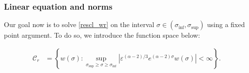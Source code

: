 \documentclass[letterpaper,11pt]{article}
\newcommand{\eps}{\varepsilon}
\numberwithin{equation}{section}
\theoremstyle{plain}
\begin{document}
\subsubsection{Linear equation and norms}




Our goal now is to solve \eqref{rescl_wr} on the interval $\sigma \in (\sigma_{\inf}, \sigma_{\sup})$ using a fixed point argument. To do so, we introduce the function space below:

\begin{align*}
\mathcal{C}_{r} &= \left\{ w(\sigma) : \sup_{\sigma_{\sup}\ge \sigma\ge \sigma_{\inf}} \left|\eps^{(\alpha-2)/3} e^{(\alpha-2)\sigma}w(\sigma)\right| < \infty \right\}. \\
\end{align*}
\end{document}

